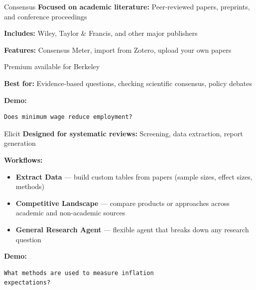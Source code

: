 \documentclass[aspectratio=169]{beamer}
\begin{document}
\begin{frame}[fragile]{Consensus}
    \textbf{Focused on academic literature:} Peer-reviewed papers, preprints, and conference proceedings

    \vspace{0.5em}
    \textbf{Includes:} Wiley, Taylor \& Francis, and other major publishers

    \vspace{0.5em}
    \textbf{Features:} Consensus Meter, import from Zotero, upload your own papers

    \vspace{0.5em}
    Premium available for Berkeley

    \vspace{1em}
    \textbf{Best for:} Evidence-based questions, checking scientific consensus, policy debates

    \vspace{1em}
    \textbf{Demo:}
    \begin{lstlisting}[basicstyle=\ttfamily\small]
Does minimum wage reduce employment?
    \end{lstlisting}
\end{frame}

\begin{frame}[fragile]{Elicit}
    \textbf{Designed for systematic reviews:} Screening, data extraction, report generation

    \vspace{1em}
    \textbf{Workflows:}
    \begin{itemize}
        \item \textbf{Extract Data} --- build custom tables from papers (sample sizes, effect sizes, methods)
        \item \textbf{Competitive Landscape} --- compare products or approaches across academic and non-academic sources
        \item \textbf{General Research Agent} --- flexible agent that breaks down any research question
    \end{itemize}

    \vspace{1em}
    \textbf{Demo:}
    \begin{lstlisting}[basicstyle=\ttfamily\small]
What methods are used to measure inflation
expectations?
    \end{lstlisting}
\end{frame}
\end{document}
